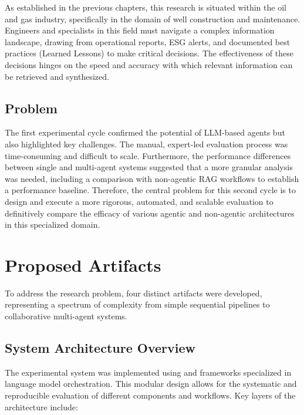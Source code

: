     As established in the previous chapters, this research is situated within the oil and gas industry, specifically in the domain of well construction and maintenance. Engineers and specialists in this field must navigate a complex information landscape, drawing from operational reports, ESG alerts, and documented best practices (Learned Lessons) to make critical decisions. The effectiveness of these decisions hinges on the speed and accuracy with which relevant information can be retrieved and synthesized.

    \subsection{Problem}

    The first experimental cycle confirmed the potential of LLM-based agents but also highlighted key challenges. The manual, expert-led evaluation process was time-consuming and difficult to scale. Furthermore, the performance differences between single and multi-agent systems suggested that a more granular analysis was needed, including a comparison with non-agentic RAG workflows to establish a performance baseline. Therefore, the central problem for this second cycle is to design and execute a more rigorous, automated, and scalable evaluation to definitively compare the efficacy of various agentic and non-agentic architectures in this specialized domain.


\section{Proposed Artifacts}

    To address the research problem, four distinct artifacts were developed, representing a spectrum of complexity from simple sequential pipelines to collaborative multi-agent systems. 
    
    \subsection{System Architecture Overview}

    The experimental system was implemented using \citet{Langchain2025} and \citet{Langgraph2025} frameworks specialized in language model orchestration. This modular design allows for the systematic and reproducible evaluation of different components and workflows. Key layers of the architecture include:

